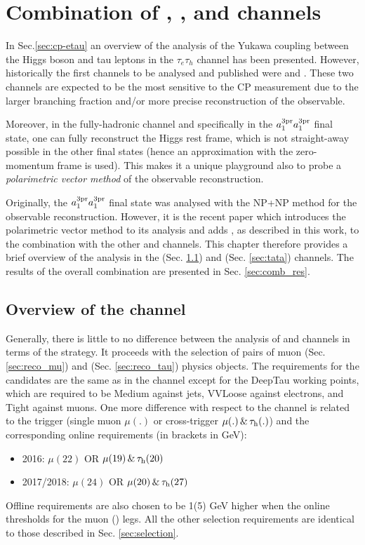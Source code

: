 \chapter{Combination of \et, \mt, and \tata channels}\label{sec:comb}

In Sec.\ref{sec:cp-etau} an overview of the analysis of the Yukawa coupling between the Higgs boson and tau leptons in the $\tau_e\tau_h$ channel has been presented. However, historically the first channels to be analysed and published were \mt and \tata \cite{CMS:2020rpr, Cardini:2021hbb}. These two channels are expected to be the most sensitive to the CP measurement due to the larger branching fraction and/or more precise reconstruction of the \phicp observable. 

Moreover, in the fully-hadronic \tata channel and specifically in the $a_1^\text{3pr} a_1^\text{3pr}$ final state, one can fully reconstruct the Higgs rest frame, which is not straight-away possible in the other final states (hence an approximation with the zero-momentum frame is used). This makes it a unique playground also to probe a\textit{ polarimetric vector method} of the \phicp observable reconstruction. 

Originally, the $a_1^\text{3pr} a_1^\text{3pr}$ final state was analysed with the NP+NP method for the \phicp observable reconstruction. However, it is the recent paper \cite{CMS:2021sdq} which introduces the polarimetric vector method to its analysis and adds \et, as described in this work, to the combination with the other \mt and \tata channels. This chapter therefore provides a brief overview of the analysis in the \mt (Sec. \ref{sec:mt}) and \tata (Sec. \ref{sec:tata}) channels. The results of the overall combination are presented in Sec. \ref{sec:comb_res}.

\section{Overview of the \mt channel}\label{sec:mt}
Generally, there is little to no difference between the analysis of \mt and \et channels in terms of the strategy. It proceeds with the selection of pairs of muon (Sec. \ref{sec:reco_mu}) and \tauh (Sec. \ref{sec:reco_tau}) physics objects. The requirements for the \tauh candidates are the same as in the \et channel except for the DeepTau working points, which are required to be Medium against jets, VVLoose against electrons, and Tight against muons. One more difference with respect to the \et channel is related to the trigger (single muon $\mu(.)$ or cross-trigger $\mu(.) \, \& \, \tau_\mathrm{h} (.)$) and the corresponding online \pt requirements (in brackets in GeV):
    \begin{itemize}
        \item 2016: $\mu(22)$ OR $\mu(19) \, \& \, \tau_\mathrm{h}(20)$
        \item 2017/2018: $\mu(24)$ OR $\mu(20) \, \& \, \tau_\mathrm{h}(27)$
    \end{itemize}
Offline \pt requirements are also chosen to be 1(5) GeV higher when the online \pt thresholds for the muon (\tauh) legs. All the other selection requirements are identical to those described in Sec. \ref{sec:selection}.

